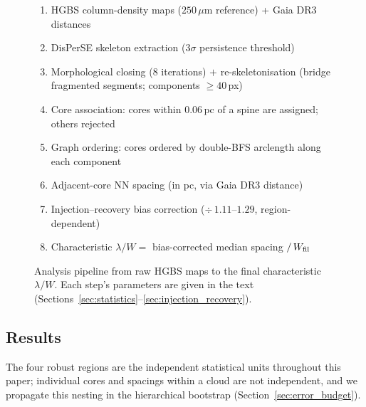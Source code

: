 \documentclass[usenatbib,twoside,twocolumn]{mnras}
\begin{document}
\begin{figure}
\centering
\begin{minipage}{0.95\columnwidth}
\footnotesize
\begin{enumerate}\setlength{\itemsep}{2pt}
\item HGBS column-density maps ($250\,\mu$m reference) + Gaia DR3 distances
\item DisPerSE skeleton extraction ($3\sigma$ persistence threshold)
\item Morphological closing (8 iterations) $+$ re-skeletonisation (bridge fragmented segments; components $\geq40$\,px)
\item Core association: cores within $0.06$\,pc of a spine are assigned; others rejected
\item Graph ordering: cores ordered by double-BFS arclength along each component
\item Adjacent-core NN spacing (in pc, via Gaia DR3 distance)
\item Injection--recovery bias correction ($\div\,1.11$--$1.29$, region-dependent)
\item Characteristic $\lambda/W = $ bias-corrected median spacing $/\,W_{\rm fil}$
\end{enumerate}
\end{minipage}
\caption{Analysis pipeline from raw HGBS maps to the final characteristic $\lambda/W$. Each step's parameters are given in the text (Sections~\ref{sec:statistics}--\ref{sec:injection_recovery}).}
\label{fig:pipeline}
\end{figure}

\subsection{Results}

The four robust regions are the independent statistical units throughout this paper; individual cores and spacings within a cloud are not independent, and we propagate this nesting in the hierarchical bootstrap (Section~\ref{sec:error_budget}).
\end{document}
